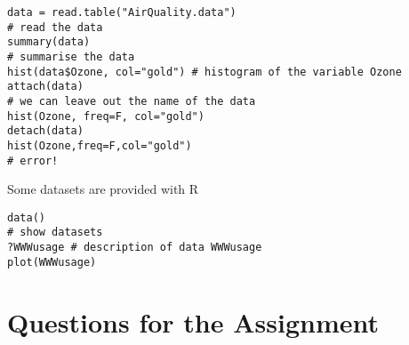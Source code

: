 \documentclass[a4paper,10pt]{article}
\begin{document}
\begin{lstlisting}
data = read.table("AirQuality.data")
# read the data 
summary(data)
# summarise the data 
hist(data$Ozone, col="gold") # histogram of the variable Ozone
attach(data)
# we can leave out the name of the data 
hist(Ozone, freq=F, col="gold")
detach(data)
hist(Ozone,freq=F,col="gold")
# error! 
\end{lstlisting}

\noindent
Some datasets are provided with R

\begin{lstlisting}
data()
# show datasets 
?WWWusage # description of data WWWusage
plot(WWWusage)
\end{lstlisting}

\section{Questions for the Assignment} 
\end{document}
